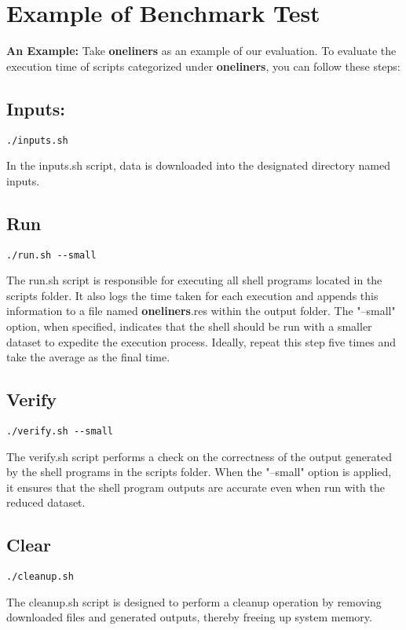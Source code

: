 \documentclass[sigplan, screen, 10pt]{acmart}
\begin{document}
\section{Example of Benchmark Test}
\label{ex}

\textbf{An Example:}
Take \textbf{oneliners} as an example of our evaluation. To evaluate the execution time of scripts categorized under \textbf{oneliners}, you can follow these steps:
\subsection{Inputs:}
\begin{verbatim}
./inputs.sh
\end{verbatim}
In the inputs.sh script, data is downloaded into the designated directory named inputs.
\subsection{Run}
\begin{verbatim}
./run.sh --small
\end{verbatim}
The run.sh script is responsible for executing all shell programs located in the scripts folder. It also logs the time taken for each execution and appends this information to a file named \textbf{oneliners}.res within the output folder. The "--small" option, when specified, indicates that the shell should be run with a smaller dataset to expedite the execution process. Ideally, repeat this step five times and take the average as the final time.
\subsection{Verify}
\begin{verbatim}
./verify.sh --small
\end{verbatim}
The verify.sh script performs a check on the correctness of the output generated by the shell programs in the scripts folder. When the "--small" option is applied, it ensures that the shell program outputs are accurate even when run with the reduced dataset.
\subsection{Clear}
\begin{verbatim}
./cleanup.sh
\end{verbatim}
The cleanup.sh script is designed to perform a cleanup operation by removing downloaded files and generated outputs, thereby freeing up system memory.
\end{document}
